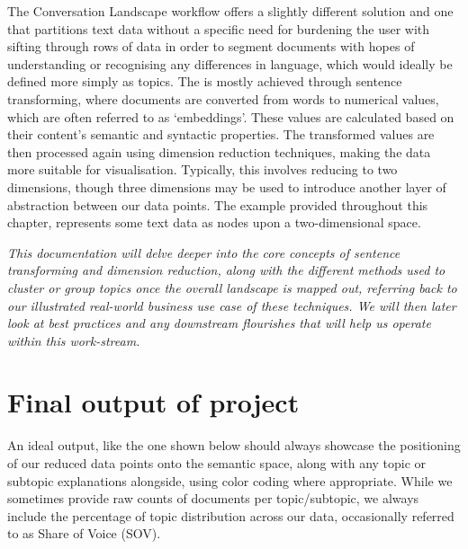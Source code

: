 \documentclass[
  letterpaper,
  DIV=11,
  numbers=noendperiod]{scrreprt}
\begin{document}
The Conversation Landscape workflow offers a slightly different solution
and one that partitions text data without a specific need for burdening
the user with sifting through rows of data in order to segment documents
with hopes of understanding or recognising any differences in language,
which would ideally be defined more simply as topics. The is mostly
achieved through sentence transforming, where documents are converted
from words to numerical values, which are often referred to as
`embeddings'. These values are calculated based on their content's
semantic and syntactic properties. The transformed values are then
processed again using dimension reduction techniques, making the data
more suitable for visualisation. Typically, this involves reducing to
two dimensions, though three dimensions may be used to introduce another
layer of abstraction between our data points. The example provided
throughout this chapter, represents some text data as nodes upon a
two-dimensional space.

\begin{tcolorbox}[enhanced jigsaw, colback=white, opacitybacktitle=0.6, coltitle=black, left=2mm, breakable, bottomtitle=1mm, toptitle=1mm, toprule=.15mm, colframe=quarto-callout-note-color-frame, titlerule=0mm, title=\textcolor{quarto-callout-note-color}{\faInfo}\hspace{0.5em}{Note}, colbacktitle=quarto-callout-note-color!10!white, rightrule=.15mm, bottomrule=.15mm, arc=.35mm, opacityback=0, leftrule=.75mm]

\emph{This documentation will delve deeper into the core concepts of
sentence transforming and dimension reduction, along with the different
methods used to cluster or group topics once the overall landscape is
mapped out, referring back to our illustrated real-world business use
case of these techniques. We will then later look at best practices and
any downstream flourishes that will help us operate within this
work-stream.}

\end{tcolorbox}

\section{Final output of project}\label{final-output-of-project}

An ideal output, like the one shown below should always showcase the
positioning of our reduced data points onto the semantic space, along
with any topic or subtopic explanations alongside, using color coding
where appropriate. While we sometimes provide raw counts of documents
per topic/subtopic, we always include the percentage of topic
distribution across our data, occasionally referred to as Share of Voice
(SOV).
\end{document}
